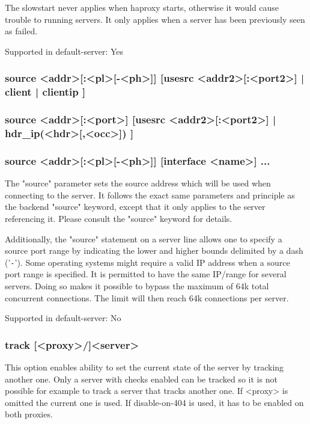   The slowstart never applies when haproxy starts, otherwise it would cause
  trouble to running servers. It only applies when a server has been previously
  seen as failed.

  Supported in default-server: Yes

\subsubsection[source]{
source <addr>[:<pl>[-<ph>]] [usesrc { <addr2>[:<port2>] | client | clientip } ]
}
\subsubsection*{
source <addr>[:<port>] [usesrc { <addr2>[:<port2>] | hdr\_ip(<hdr>[,<occ>]) } ]
}
\subsubsection*{
source <addr>[:<pl>[-<ph>]] [interface <name>] ...
}

  The "source" parameter sets the source address which will be used when
  connecting to the server. It follows the exact same parameters and principle
  as the backend "source" keyword, except that it only applies to the server
  referencing it. Please consult the "source" keyword for details.

  Additionally, the "source" statement on a server line allows one to specify a
  source port range by indicating the lower and higher bounds delimited by a
  dash ('\verb|-|'). Some operating systems might require a valid IP address when a
  source port range is specified. It is permitted to have the same IP/range for
  several servers. Doing so makes it possible to bypass the maximum of 64k
  total concurrent connections. The limit will then reach 64k connections per
  server.

  Supported in default-server: No

\subsubsection[track]{track [<proxy>/]<server>}
  This option enables ability to set the current state of the server by
  tracking another one. Only a server with checks enabled can be tracked
  so it is not possible for example to track a server that tracks another
  one. If <proxy> is omitted the current one is used. If disable-on-404 is
  used, it has to be enabled on both proxies.

